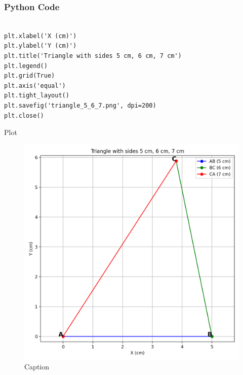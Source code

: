 \documentclass{beamer}
\begin{document}
\begin{frame}[fragile]
    \frametitle{Python Code}
    \begin{lstlisting}

plt.xlabel('X (cm)')
plt.ylabel('Y (cm)')
plt.title('Triangle with sides 5 cm, 6 cm, 7 cm')
plt.legend()
plt.grid(True)
plt.axis('equal')
plt.tight_layout()
plt.savefig('triangle_5_6_7.png', dpi=200)
plt.close()
    \end{lstlisting}
\end{frame}


  
\begin{frame}{Plot}
\begin{figure}
    \centering
    \includegraphics[width=0.5\linewidth]{Beamer/figs/triangle_5_6_7.png}
    \caption{Caption}
    \label{fig:placeholder}
\end{figure}
\end{frame}
\end{document}
